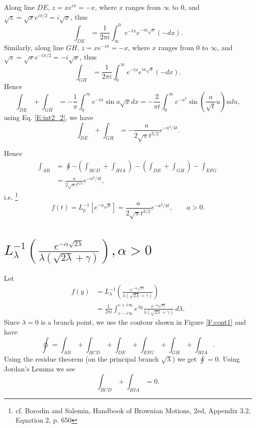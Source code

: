 Along line $DE$, $z=x e^{i\pi}=-x$, where $x$ ranges from $\infty$ to $0$, and 
$\sqrt{z}=\sqrt{x} e^{i\pi /2}= i\sqrt{x}$, thus
\[
	\int_{DE} = \frac{1}{2\pi i} \int_{\infty}^0 e^{-tx} e^{-i a \sqrt{x}} (-dx).
\]
Similarly, along line $GH$, $z=x e^{-i\pi}=-x$, where $x$ ranges from $0$ to
$\infty$, and $\sqrt{z}=\sqrt{x} e^{-i\pi/2} = -i\sqrt{x}$, thus 
\[
	\int_{GH} = \frac{1}{2\pi i} \int^{\infty}_0 e^{-tx} e^{i a \sqrt{x}} (-dx).
\]
Hence
\[
	\int_{DE} + \int_{GH}
	= -\frac{1}{\pi} \int_0^{\infty} e^{-tx} \sin a\sqrt{x} dx
	= -\frac{2}{\pi t} 
	  \int_0^{\infty} e^{-u^2} \sin \left( \frac{a}{\sqrt{t}} u \right) u du,
\]
using Eq. \ref{E:int2_2}, we have
\[
	\int_{DE} + \int_{GH}
	= - \frac{a}{2\sqrt{\pi} t^{3/2}} e^{-a^2/4t}.
\]

Hence 
\begin{align*}
  \int_{AB} 
	&= \oint - \left( \int_{BCD} + \int_{HIA} \right)
     - \left( \int_{DE} + \int_{GH} \right) - \int_{EFG}  \\
  &= \frac{a}{2\sqrt{\pi} t^{3/2}} e^{-a^2/4t}, 
\end{align*}
i.e.
\footnote{cf. Borodin and Salemin, Handbook of Brownian Motions, 2ed, Appendix
3.2, Equation 2, p. 650}
\begin{equation} \label{E:ilt_1a}
	f(t)= L_p^{-1}\left[ e^{-a\sqrt{p}} \right]
      = \frac{a}{2\sqrt{\pi} t^{3/2}} e^{-a^2/4t}, \qquad a>0.
\end{equation}

\section{$ L_{\lambda}^{-1} 
\left( \frac{e^{-\alpha \sqrt{2\lambda}}}{\lambda(\sqrt{2\lambda}+\gamma)}
\right), \alpha > 0 $}
Let
\begin{align*}
  f(y) &= L_{\lambda}^{-1} 
          \left( 
            \frac{e^{-\alpha \sqrt{2\lambda}}}{\lambda(\sqrt{2\lambda}+\gamma)} 
          \right)    \\
       &= \frac{1}{2\pi i}   
           \int_{c-i\infty}^{c+i\infty} e^{\lambda y} 
           \frac{e^{-\alpha \sqrt{2\lambda}}}{\lambda(\sqrt{2\lambda}+\gamma)} 
           \, d\lambda.
\end{align*}
Since $\lambda=0$ is a branch point, we use the contour shown in Figure
\ref{F:cont1} and have
\[
  \oint = \int_{AB} + \int_{BCD} + \int_{DE} + \int_{EFG} + \int_{GH}
          + \int_{HIA}.
\]
Using the residue theorem (on the principal branch $\sqrt{\lambda}$) we get 
$\oint=0$. Using Jordan's Lemma we see
\[
  \int_{BCD} + \int_{HIA} = 0.
\]


